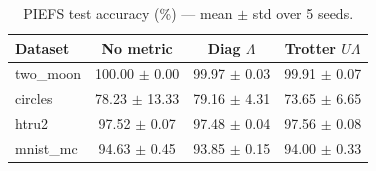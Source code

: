 \begin{table}[t]
\centering
\caption{PIEFS test accuracy (\%) — mean $\pm$ std over 5 seeds.}
\label{tab:main_grid}
\begin{tabular}{lccc}
\toprule
Dataset & No metric & Diag $\Lambda$ & Trotter $U\Lambda$ \\
\midrule
two\_moon & 100.00 $\pm$ 0.00 & 99.97 $\pm$ 0.03 & 99.91 $\pm$ 0.07 \\
circles & 78.23 $\pm$ 13.33 & 79.16 $\pm$ 4.31 & 73.65 $\pm$ 6.65 \\
htru2 & 97.52 $\pm$ 0.07 & 97.48 $\pm$ 0.04 & 97.56 $\pm$ 0.08 \\
mnist\_mc & 94.63 $\pm$ 0.45 & 93.85 $\pm$ 0.15 & 94.00 $\pm$ 0.33 \\
\bottomrule
\end{tabular}
\end{table}
